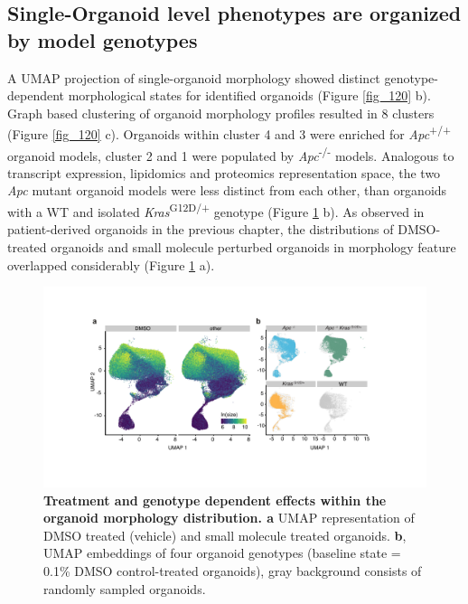 \begin{flushleft}
\clearpage
\subsection{Single-Organoid level phenotypes are organized by model genotypes}
A UMAP projection of single-organoid morphology showed distinct genotype-dependent morphological states for identified organoids (Figure \ref{fig_120} b). Graph based clustering of organoid morphology profiles resulted in 8 clusters (Figure \ref{fig_120} c). Organoids within cluster 4 and 3 were enriched for \textit{Apc}\textsuperscript{+/+} organoid models, cluster 2 and 1 were populated by \textit{Apc}\textsuperscript{-/-}  models. Analogous to transcript expression, lipidomics and proteomics representation space, the two \textit{Apc} mutant organoid models were less distinct from each other, than organoids with a WT and isolated \textit{Kras}\textsuperscript{G12D/+} genotype (Figure \ref{fig_140} b).  As observed in patient-derived organoids in the previous chapter, the distributions of DMSO-treated organoids and small molecule perturbed organoids in morphology feature overlapped considerably (Figure \ref{fig_140} a). 

\bigbreak
\begin{figure}[h!]
\centering
\includegraphics[width=\textwidth,
                height=\textheight,
                keepaspectratio]{figures/adenomaprofiling/pdf/fig_1_4.pdf}
\caption[Treatment and genotype dependent effects within the organoid morphology distribution]{\textbf{Treatment and genotype dependent effects within the organoid morphology distribution. a} UMAP representation of DMSO treated (vehicle) and small molecule treated organoids. \textbf{b}, UMAP embeddings of four organoid genotypes (baseline state = 0.1\% DMSO control-treated organoids), gray background consists of randomly sampled organoids.}
\label{fig_140}
\end{figure}


\end{flushleft}
